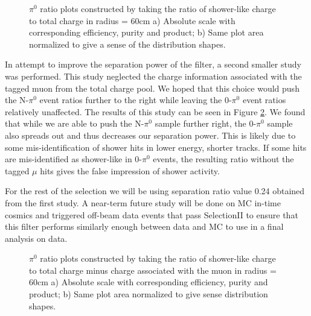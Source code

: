 \documentclass[12pt]{article}
\begin{document}
\begin{figure}[H]
\centering
{}
\hspace{1 mm}
\caption{$\pi^0$ ratio plots constructed by taking the ratio of shower-like charge to total charge in radius = 60cm a) Absolute scale with corresponding efficiency, purity and product; b) Same plot area normalized to give a sense of the distribution shapes. }
\label{fig:separation}
\end{figure}

In attempt to improve the separation power of the filter, a second smaller study was performed. This study neglected the charge information associated with the tagged muon from the total charge pool. We hoped that this choice would push the N-$\pi^0$ event ratios further to the right while leaving the 0-$\pi^0$ event ratios relatively unaffected.  The results of this study can be seen in Figure \ref{fig:separation_no_mu}.  We found that while we are able to push the N-$\pi^0$ sample further right, the 0-$\pi^0$ sample also spreads out and thus decreases our separation power. This is likely due to some mis-identification of shower hits in lower energy, shorter tracks.  If some hits are mis-identified as shower-like in 0-$\pi^0$ events, the resulting ratio without the tagged $\mu$ hits gives the false impression of shower activity. 
\par For the rest of the selection we will be using separation ratio value 0.24 obtained from the first study. A near-term future study will be done on MC in-time cosmics and triggered off-beam data events that pass SelectionII to ensure that this filter performs similarly enough between data and MC to use in a final analysis on data.

\begin{figure}[H]
\centering
{}
\hspace{1 mm}
\caption{$\pi^0$ ratio plots constructed by taking the ratio of shower-like charge to total charge minus charge associated with the muon in radius = 60cm a) Absolute scale with corresponding efficiency, purity and product; b) Same plot area normalized to give sense distribution shapes. }
\label{fig:separation_no_mu}
\end{figure}
\end{document}
